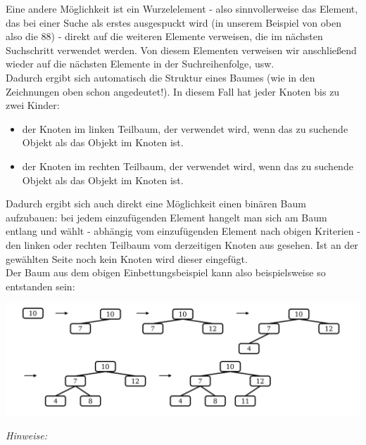 \documentclass{article}
\begin{document}
Eine andere Möglichkeit ist ein Wurzelelement - also sinnvollerweise das Element, das bei einer Suche als erstes ausgespuckt wird (in unserem Beispiel von oben also die 88) - direkt auf die weiteren Elemente verweisen, die im nächsten Suchschritt verwendet werden. Von diesem Elementen verweisen wir anschließend wieder auf die nächsten Elemente in der Suchreihenfolge, usw. \\
Dadurch ergibt sich automatisch die Struktur eines Baumes (wie in den Zeichnungen oben schon angedeutet!). In diesem Fall hat jeder Knoten bis zu zwei Kinder:
\begin{itemize}
    \item der Knoten im linken Teilbaum, der verwendet wird, wenn das zu suchende Objekt  als das Objekt im Knoten ist.
    \item der Knoten im rechten Teilbaum, der verwendet wird, wenn das zu suchende Objekt  als das Objekt im Knoten ist.
\end{itemize}
Dadurch ergibt sich auch direkt eine Möglichkeit einen binären Baum aufzubauen: bei jedem einzufügenden Element hangelt man sich am Baum entlang und wählt - abhängig vom einzufügenden Element nach obigen Kriterien - den linken oder rechten Teilbaum vom derzeitigen Knoten aus gesehen. Ist an der gewählten Seite noch kein Knoten wird dieser eingefügt. \\
Der Baum aus dem obigen Einbettungsbeispiel kann also beispielsweise so entstanden sein: 
\begin{center}
    \includegraphics[scale=0.26]{../../media/insertExample.png}
\end{center}
\textit{Hinweise:}
\end{document}
